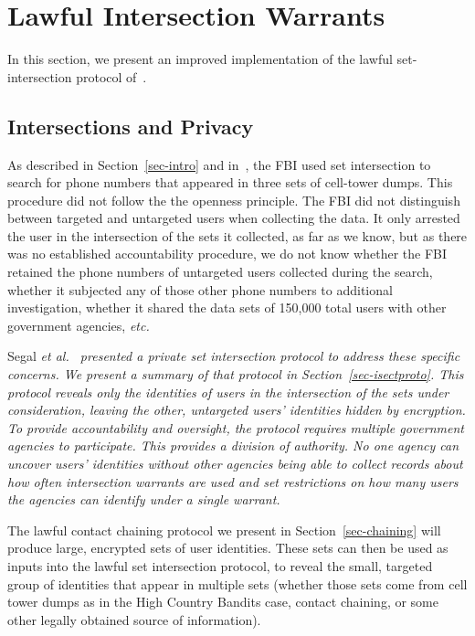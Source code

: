 \section{Lawful Intersection Warrants}\label{sec-intersection}
In this section, we present an improved implementation of the lawful
set-intersection protocol of~\cite{sff-foci2014}. 
\subsection{Intersections and Privacy}

As described in Section~\ref{sec-intro} and in~\cite{sff-foci2014}, the FBI used
set intersection to search for phone numbers that appeared in three sets of
cell-tower dumps. This procedure did not follow the the openness principle.
The FBI did not distinguish between targeted and untargeted users when
collecting the data. It only arrested the user in the intersection of the sets
it collected, as far as we know, but as there was no established accountability
procedure, we do not know whether the FBI retained the phone numbers of
untargeted users collected during the search, whether it subjected any of those
other phone numbers to additional investigation, whether it shared the data sets
of 150,000 total users with other government agencies, \it{etc}. 

Segal \it{et al.}~\cite{sff-foci2014} presented a private set intersection
protocol to address these specific concerns. We present a summary of that protocol
in Section~\ref{sec-isectproto}. This protocol reveals \emph{only} the identities
of users in the intersection of the sets under consideration, leaving the other,
untargeted users' identities hidden by encryption. To provide accountability and
oversight, the protocol requires multiple government agencies to participate. This
provides a division of authority. No one agency can uncover users' identities
without other agencies being able to collect records about how often intersection
warrants are used and set restrictions on how many users the agencies can identify
under a single warrant.

The lawful contact chaining protocol we present in Section~\ref{sec-chaining} will
produce large, encrypted sets of user identities. These sets can then be used as
inputs into the lawful set intersection protocol, to reveal the small, targeted
group of identities that appear in multiple sets (whether those sets come from cell
tower dumps as in the High Country Bandits case, contact chaining, or some other
legally obtained source of information). 

